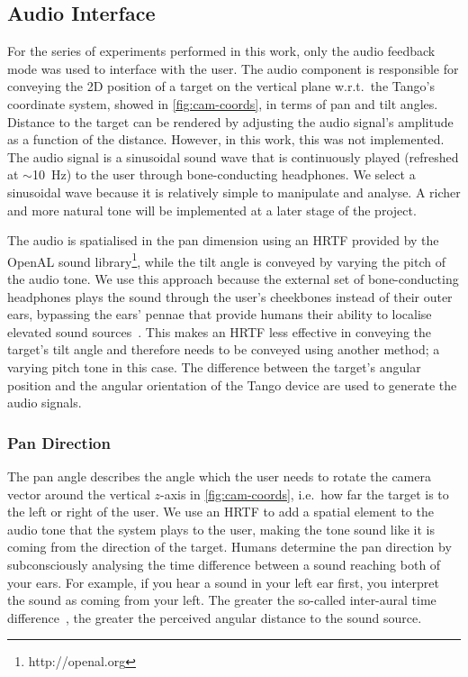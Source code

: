 \documentclass[sigconf, review=true, screen=true, anonymous=true]{acmart}
\begin{document}
\subsection{Audio Interface}

For the series of experiments performed in this work, only the audio feedback mode was used to interface with the user.
The audio component is responsible for conveying the 2D position of a target on the vertical plane w.r.t.\ the Tango's coordinate system, showed in \cref{fig:cam-coords}, in terms of pan and tilt angles.
Distance to the target can be rendered by adjusting the audio signal's amplitude as a function of the distance.
However, in this work, this was not implemented.
The audio signal is a sinusoidal sound wave that is continuously played (refreshed at $\sim$\SI{10}{\hertz}) to the user through bone-conducting headphones.
We select a sinusoidal wave because it is relatively simple to manipulate and analyse.
A richer and more natural tone will be implemented at a later stage of the project. 

The audio is spatialised in the pan dimension using an HRTF provided by the OpenAL sound library\footnote{http://openal.org}, while the tilt angle is conveyed by varying the pitch of the audio tone.
We use this approach because the external set of bone-conducting headphones plays the sound through the user's cheekbones instead of their outer ears, bypassing the ears' pennae that provide humans their ability to localise elevated sound sources~\cite{roffler1968factors, algazi2001elevation}.
This makes an HRTF less effective in conveying the target's tilt angle and therefore needs to be conveyed using another method; a varying pitch tone in this case.
The difference between the target's angular position and the angular orientation of the Tango device are used to generate the audio signals. 

\subsubsection{Pan Direction}

The pan angle describes the angle which the user needs to rotate the camera vector around the vertical $z$-axis in \cref{fig:cam-coords}, i.e.\ how far the target is to the left or right of the user.
We use an HRTF to add a spatial element to the audio tone that the system plays to the user, making the tone sound like it is coming from the direction of the target.
Humans determine the pan direction by subconsciously analysing the time difference between a sound reaching both of your ears.
For example, if you hear a sound in your left ear first, you interpret the sound as coming from your left.
The greater the so-called inter-aural time difference~\cite{wightman1992dominant}, the greater the perceived angular distance to the sound source.
\end{document}
